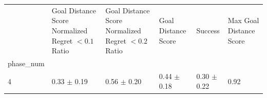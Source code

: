 \begin{tabular}{llllll}
\toprule
 & Goal Distance Score Normalized Regret $< 0.1$ Ratio & Goal Distance Score Normalized Regret $< 0.2$ Ratio & Goal Distance Score & Success & Max Goal Distance Score \\
phase_num &  &  &  &  &  \\
\midrule
4 & 0.33 $\pm$ 0.19 & 0.56 $\pm$ 0.20 & 0.44 $\pm$ 0.18 & 0.30 $\pm$ 0.22 & 0.92 \\
\bottomrule
\end{tabular}
